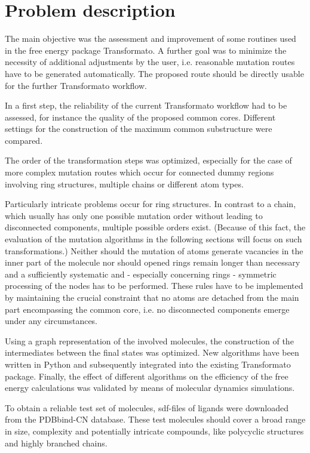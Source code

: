 \chapter{Problem description }

The main objective was the assessment and improvement of some routines
used in the free energy package Transformato. A further goal was to
minimize the necessity of additional adjustments by the user, i.e.
reasonable mutation routes have to be generated automatically. The
proposed route should be directly usable for the further Transformato
workflow.

In a first step, the reliability of the current Transformato workflow
had to be assessed, for instance the quality of the proposed common
cores. Different settings for the construction of the maximum common
substructure were compared. 

The order of the transformation steps was optimized, especially
for the case of more complex mutation routes which occur for connected
dummy regions involving ring structures, multiple chains or different
atom types. 

Particularly intricate problems occur for ring structures. In contrast to a chain, which usually has only one possible mutation order without leading to disconnected components, multiple possible orders exist. (Because of this fact, the evaluation of the mutation algorithms in the following sections will focus on such transformations.) Neither should
the mutation of atoms generate vacancies in the inner part of the
molecule nor should opened rings remain longer than necessary and
a sufficiently systematic and - especially concerning rings - symmetric
processing of the nodes has to be performed. These rules have to be
implemented by maintaining the crucial constraint that no atoms are
detached from the main part encompassing the common core, i.e. no
disconnected components emerge under any circumstances.

Using a graph representation of the involved molecules, the construction
of the intermediates between the final states was optimized.
New algorithms have been written in Python and subsequently integrated
into the existing Transformato package. Finally, the effect of different
algorithms on the efficiency of the free energy calculations was validated by means of molecular dynamics simulations. 

To obtain a reliable test set of molecules, sdf-files of ligands were downloaded from the PDBbind-CN database. These test molecules should cover a
broad range in size, complexity and potentially intricate compounds,
like polycyclic structures and highly branched chains.

